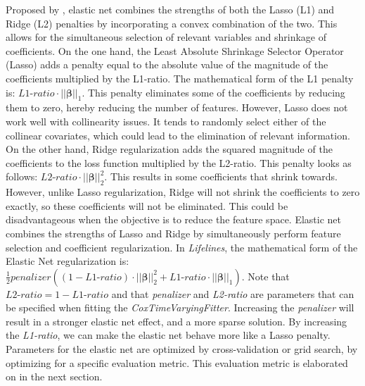 Proposed by \cite{zou2005regularization}, elastic net combines the strengths of both the Lasso (L1) and Ridge (L2) penalties by incorporating a convex combination of the two. This allows for the simultaneous selection of relevant variables and shrinkage of coefficients. On the one hand, the Least Absolute Shrinkage Selector Operator (Lasso) adds a penalty equal to the absolute value of the magnitude of the coefficients multiplied by the L1-ratio. The mathematical form of the L1 penalty is: $\textit{L1-ratio} \cdot ||\boldsymbol{\beta}||_1$. This penalty eliminates some of the coefficients by reducing them to zero, hereby reducing the number of features. However, Lasso does not work well with collinearity issues.  It tends to randomly select either of the collinear covariates, which could lead to the elimination of relevant information. On the other hand, Ridge regularization adds the squared magnitude of the coefficients to the loss function multiplied by the L2-ratio. This penalty looks as follows: $\textit{L2-ratio} \cdot ||\boldsymbol{\beta}||^2_2$. This results in some coefficients that shrink towards. However, unlike Lasso regularization, Ridge will not shrink the coefficients to zero exactly, so these coefficients will not be eliminated. This could be disadvantageous when the objective is to reduce the feature space. Elastic net combines the strengths of Lasso and Ridge by simultaneously perform feature selection and coefficient regularization. In \textit{Lifelines}, the mathematical form of the Elastic Net regularization is: $\frac{1}{2}\textit{penalizer} ((1- \textit{L1-ratio}) \cdot ||\boldsymbol{\beta}||^2_2 + \textit{L1-ratio} \cdot ||\boldsymbol{\beta}||_1)$. Note that $\textit{L2-ratio} = 1 - \textit{L1-ratio}$ and that \textit{penalizer} and \textit{L2-ratio} are parameters that can be specified when fitting the \textit{CoxTimeVaryingFitter}. Increasing the \textit{penalizer} will result in a stronger elastic net effect, and a more sparse solution. By increasing the \textit{L1-ratio}, we can make the elastic net behave more like a Lasso penalty. Parameters for the elastic net are optimized by cross-validation or grid search, by optimizing for a specific evaluation metric. This evaluation metric is elaborated on in the next section. 

